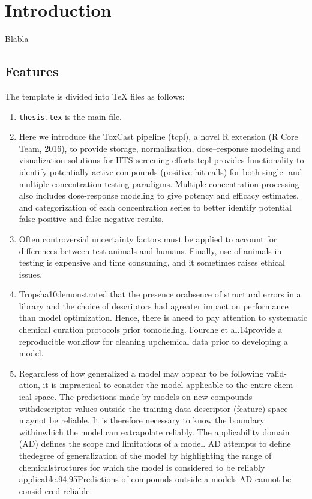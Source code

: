 \newcommand{\package}{\emph}

\chapter{Introduction}
\label{chap:introduction}

Blabla

\section{Features}
\label{sec:features}
The template is divided into \TeX{} files as follows:
\begin{enumerate}
\item \texttt{thesis.tex} is the main file.
\item Here we introduce the ToxCast pipeline (tcpl), a
    novel R extension (R Core Team, 2016), to provide storage,
    normalization, dose–response modeling and visualization solutions
    for HTS screening efforts.tcpl provides functionality to identify potentially active compounds (positive hit-calls) for both single- and
    multiple-concentration testing paradigms. Multiple-concentration
    processing also includes dose-response modeling to give potency and
    efficacy estimates, and categorization of each concentration series to
    better identify potential false positive and false negative results.
    \item 
    Often controversial uncertainty factors
    must be applied to account for differences
    between test animals and humans. Finally,
    use of animals in testing is expensive and
    time consuming, and it sometimes raises
    ethical issues.
    \item Tropsha10demonstrated that the presence orabsence of structural errors in a library and the choice of descriptors had agreater impact on performance than model optimization. Hence, there is aneed to pay attention to systematic chemical curation protocols prior tomodeling. Fourche et al.14provide a reproducible workflow for cleaning upchemical data prior to developing a model.
    \item Regardless of how generalized a model may appear to be following valid-ation, it is impractical to consider the model applicable to the entire chem-ical space. The predictions made by models on new compounds withdescriptor values outside the training data descriptor (feature) space maynot be reliable. It is therefore necessary to know the boundary withinwhich the model can extrapolate reliably. The applicability domain (AD) defines the scope and limitations of a model. AD attempts to define thedegree of generalization of the model by highlighting the range of chemicalstructures for which the model is considered to be reliably applicable.94,95Predictions  of  compounds  outside  a  models  AD  cannot  be  consid-ered reliable.

\end{enumerate}
